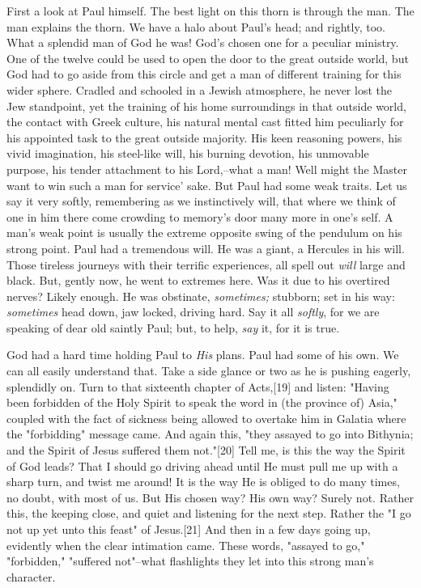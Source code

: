 First a look at Paul himself. The best light on this thorn is through the
man. The man explains the thorn. We have a halo about Paul's head; and
rightly, too. What a splendid man of God he was! God's chosen one for a
peculiar ministry. One of the twelve could be used to open the door to the
great outside world, but God had to go aside from this circle and get a
man of different training for this wider sphere. Cradled and schooled in a
Jewish atmosphere, he never lost the Jew standpoint, yet the training of
his home surroundings in that outside world, the contact with Greek
culture, his natural mental cast fitted him peculiarly for his appointed
task to the great outside majority. His keen reasoning powers, his vivid
imagination, his steel-like will, his burning devotion, his unmovable
purpose, his tender attachment to his Lord,--what a man! Well might the
Master want to win such a man for service' sake. But Paul had some weak
traits. Let us say it very softly, remembering as we instinctively will,
that where we think of one in him there come crowding to memory's door
many more in one's self. A man's weak point is usually the extreme
opposite swing of the pendulum on his strong point. Paul had a tremendous
will. He was a giant, a Hercules in his will. Those tireless journeys with
their terrific experiences, all spell out \textit{will} large and black. But,
gently now, he went to extremes here. Was it due to his overtired nerves?
Likely enough. He was obstinate, \textit{sometimes;} stubborn; set in his way:
\textit{sometimes} head down, jaw locked, driving hard. Say it all \textit{softly}, for
we are speaking of dear old saintly Paul; but, to help, \textit{say} it, for it
is true.

God had a hard time holding Paul to \textit{His} plans. Paul had some of his own.
We can all easily understand that. Take a side glance or two as he is
pushing eagerly, splendidly on. Turn to that sixteenth chapter of
Acts,[19] and listen: "Having been forbidden of the Holy Spirit to speak
the word in (the province of) Asia," coupled with the fact of sickness
being allowed to overtake him in Galatia where the "forbidding" message
came. And again this, "they assayed to go into Bithynia; and the Spirit of
Jesus suffered them not."[20] Tell me, is this the way the Spirit of God
leads? That I should go driving ahead until He must pull me up with a
sharp turn, and twist me around! It is the way He is obliged to do many
times, no doubt, with most of us. But His chosen way? His own way? Surely
not. Rather this, the keeping close, and quiet and listening for the next
step. Rather the "I go not up yet unto this feast" of Jesus.[21] And then
in a few days going up, evidently when the clear intimation came. These
words, "assayed to go," "forbidden," "suffered not"--what flashlights they
let into this strong man's character.

